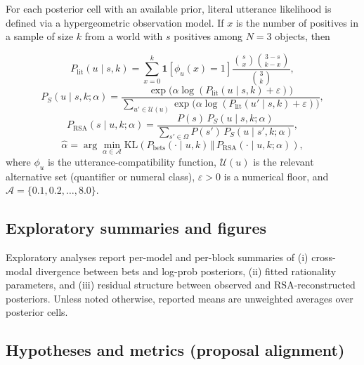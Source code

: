 \documentclass[11pt]{article}
\begin{document}
For each posterior cell with an available prior, literal utterance likelihood is defined via a hypergeometric observation model. If $x$ is the number of positives in a sample of size $k$ from a world with $s$ positives among $N=3$ objects, then
{\setlength{\abovedisplayskip}{5pt}\setlength{\belowdisplayskip}{5pt}\setlength{\abovedisplayshortskip}{4pt}\setlength{\belowdisplayshortskip}{4pt}\small
\begin{equation}
\label{eq:plithg}
P_{\mathrm{lit}}(u\mid s,k)=
\sum_{x=0}^{k}\mathbf{1}\!\left[\phi_u(x)=1\right]
\frac{\binom{s}{x}\binom{3-s}{k-x}}{\binom{3}{k}},
\end{equation}
\begin{equation}
\label{eq:speaker}
P_S(u\mid s,k;\alpha)=
\frac{\exp\!\big(\alpha\log(P_{\mathrm{lit}}(u\mid s,k)+\varepsilon)\big)}
{\sum_{u'\in\mathcal{U}(u)}\exp\!\big(\alpha\log(P_{\mathrm{lit}}(u'\mid s,k)+\varepsilon)\big)},
\end{equation}
\begin{equation}
\label{eq:listener}
P_{\mathrm{RSA}}(s\mid u,k;\alpha)=
\frac{P(s)\,P_S(u\mid s,k;\alpha)}
{\sum_{s'\in\Omega}P(s')\,P_S(u\mid s',k;\alpha)},
\end{equation}
\begin{equation}
\label{eq:alphaobj}
\hat\alpha=\arg\min_{\alpha\in\mathcal{A}}
\mathrm{KL}\!\left(P_{\mathrm{bets}}(\cdot\mid u,k)\,\Vert\,
P_{\mathrm{RSA}}(\cdot\mid u,k;\alpha)\right),
\end{equation}
\normalsize
where $\phi_u$ is the utterance-compatibility function, $\mathcal{U}(u)$ is the relevant alternative set (quantifier or numeral class), $\varepsilon>0$ is a numerical floor, and $\mathcal{A}=\{0.1,0.2,\dots,8.0\}$.




\subsection{Exploratory summaries and figures}

Exploratory analyses report per-model and per-block summaries of (i) cross-modal divergence between bets and log-prob posteriors, (ii) fitted rationality parameters, and (iii) residual structure between observed and RSA-reconstructed posteriors. Unless noted otherwise, reported means are unweighted averages over posterior cells.



\subsection{Hypotheses and metrics (proposal alignment)}

}
\end{document}

